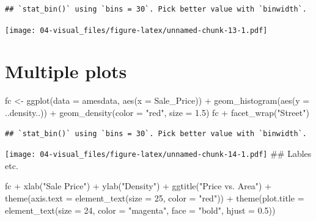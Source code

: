 \documentclass[
]{book}
\newenvironment{Shaded}{\begin{snugshade}}{\end{snugshade}}
\newcommand{\AttributeTok}[1]{\textcolor[rgb]{0.77,0.63,0.00}{#1}}
\newcommand{\DecValTok}[1]{\textcolor[rgb]{0.00,0.00,0.81}{#1}}
\newcommand{\FloatTok}[1]{\textcolor[rgb]{0.00,0.00,0.81}{#1}}
\newcommand{\FunctionTok}[1]{\textcolor[rgb]{0.00,0.00,0.00}{#1}}
\newcommand{\NormalTok}[1]{#1}
\newcommand{\OtherTok}[1]{\textcolor[rgb]{0.56,0.35,0.01}{#1}}
\newcommand{\SpecialCharTok}[1]{\textcolor[rgb]{0.00,0.00,0.00}{#1}}
\newcommand{\StringTok}[1]{\textcolor[rgb]{0.31,0.60,0.02}{#1}}
\theoremstyle{definition}
\theoremstyle{definition}
\theoremstyle{definition}
\theoremstyle{definition}
\theoremstyle{remark}
\begin{document}
\begin{verbatim}
## `stat_bin()` using `bins = 30`. Pick better value with `binwidth`.
\end{verbatim}

\texttt{[image: 04-visual\_files/figure-latex/unnamed-chunk-13-1.pdf]}

\hypertarget{multiple-plots}{%
\section{Multiple plots}\label{multiple-plots}}

\begin{Shaded}
\begin{Highlighting}[]
\NormalTok{fc }\OtherTok{\textless{}{-}} \FunctionTok{ggplot}\NormalTok{(}\AttributeTok{data =}\NormalTok{ amesdata, }\FunctionTok{aes}\NormalTok{(}\AttributeTok{x =}\NormalTok{ Sale\_Price)) }\SpecialCharTok{+}
  \FunctionTok{geom\_histogram}\NormalTok{(}\FunctionTok{aes}\NormalTok{(}\AttributeTok{y =}\NormalTok{ ..density..)) }\SpecialCharTok{+}
  \FunctionTok{geom\_density}\NormalTok{(}\AttributeTok{color =} \StringTok{"red"}\NormalTok{,}
               \AttributeTok{size =} \FloatTok{1.5}\NormalTok{)}
\NormalTok{fc }\SpecialCharTok{+} \FunctionTok{facet\_wrap}\NormalTok{(}\StringTok{"Street"}\NormalTok{)}
\end{Highlighting}
\end{Shaded}

\begin{verbatim}
## `stat_bin()` using `bins = 30`. Pick better value with `binwidth`.
\end{verbatim}

\texttt{[image: 04-visual\_files/figure-latex/unnamed-chunk-14-1.pdf]}
\#\# Lables etc.

\begin{Shaded}
\begin{Highlighting}[]
\NormalTok{fc }\SpecialCharTok{+} 
  \FunctionTok{xlab}\NormalTok{(}\StringTok{"Sale Price"}\NormalTok{) }\SpecialCharTok{+} 
  \FunctionTok{ylab}\NormalTok{(}\StringTok{"Density"}\NormalTok{) }\SpecialCharTok{+} 
  \FunctionTok{ggtitle}\NormalTok{(}\StringTok{"Price vs. Area"}\NormalTok{) }\SpecialCharTok{+}
  \FunctionTok{theme}\NormalTok{(}\AttributeTok{axis.text =} \FunctionTok{element\_text}\NormalTok{(}\AttributeTok{size =} \DecValTok{25}\NormalTok{, }\AttributeTok{color =} \StringTok{"red"}\NormalTok{)) }\SpecialCharTok{+}
  \FunctionTok{theme}\NormalTok{(}\AttributeTok{plot.title =} \FunctionTok{element\_text}\NormalTok{(}\AttributeTok{size =} \DecValTok{24}\NormalTok{, }
                                     \AttributeTok{color =} \StringTok{"magenta"}\NormalTok{, }
                                     \AttributeTok{face =} \StringTok{"bold"}\NormalTok{,}
                                     \AttributeTok{hjust =} \FloatTok{0.5}\NormalTok{)) }
\end{Highlighting}
\end{Shaded}
\end{document}

